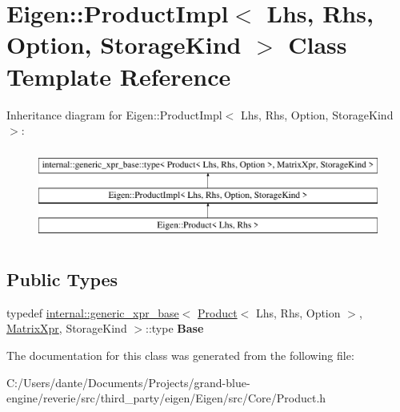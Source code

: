 \hypertarget{class_eigen_1_1_product_impl}{}\section{Eigen\+::Product\+Impl$<$ Lhs, Rhs, Option, Storage\+Kind $>$ Class Template Reference}
\label{class_eigen_1_1_product_impl}
Inheritance diagram for Eigen\+::Product\+Impl$<$ Lhs, Rhs, Option, Storage\+Kind $>$\+:\begin{figure}[H]
\begin{center}
\leavevmode
\includegraphics[height=3.000000cm]{class_eigen_1_1_product_impl}
\end{center}
\end{figure}
\subsection*{Public Types}
\begin{DoxyCompactItemize}
\item 
\mbox{\label{class_eigen_1_1_product_impl_a65c4702671bd83efd4c94df70d504a41}} 
typedef \mbox{\hyperlink{struct_eigen_1_1internal_1_1generic__xpr__base}{internal\+::generic\+\_\+xpr\+\_\+base}}$<$ \mbox{\hyperlink{class_eigen_1_1_product}{Product}}$<$ Lhs, Rhs, Option $>$, \mbox{\hyperlink{struct_eigen_1_1_matrix_xpr}{Matrix\+Xpr}}, Storage\+Kind $>$\+::type {\bfseries Base}
\end{DoxyCompactItemize}


The documentation for this class was generated from the following file\+:\begin{DoxyCompactItemize}
\item 
C\+:/\+Users/dante/\+Documents/\+Projects/grand-\/blue-\/engine/reverie/src/third\+\_\+party/eigen/\+Eigen/src/\+Core/Product.\+h\end{DoxyCompactItemize}
